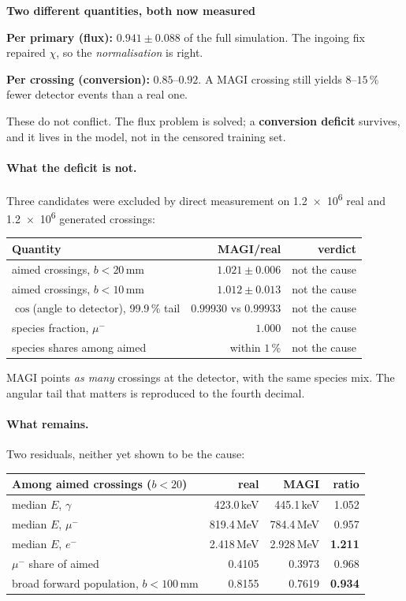 \documentclass[11pt,a4paper]{article}
\newenvironment{callout}[3]%
{\par\medskip\noindent
 \def\calloutframe{#1}\def\calloutback{#2}%
 \setlength{\fboxrule}{0.9pt}\setlength{\fboxsep}{8pt}%
 \begin{lrbox}{\calloutbox}%
 \begin{minipage}{\dimexpr\textwidth-2\fboxsep-2\fboxrule\relax}%
 \setlength{\parskip}{4pt}%
 \textcolor{#1}{\textbf{#3}}\par\nobreak\smallskip}
{\end{minipage}\end{lrbox}%
 \fcolorbox{\calloutframe}{\calloutback}{\usebox{\calloutbox}}%
 \par\medskip}
\begin{document}
\begin{callout}{warn}{red!4}{Two different quantities, both now measured}
\textbf{Per primary (flux):} $0.941 \pm 0.088$ of the full simulation. The
ingoing fix repaired $\chi$, so the \emph{normalisation} is right.

\textbf{Per crossing (conversion):} $0.85$--$0.92$. A MAGI crossing still yields
$8$--$15\,\%$ fewer detector events than a real one.

These do not conflict. The flux problem is solved; a \textbf{conversion deficit}
survives, and it lives in the model, not in the censored training set.
\end{callout}

\paragraph{What the deficit is not.} Three candidates were excluded by direct
measurement on \num{1.2e6} real and \num{1.2e6} generated crossings:

\begin{center}
\begin{tabular}{lrr}
\toprule
Quantity & MAGI/real & verdict \\
\midrule
aimed crossings, $b<20$\,mm     & $1.021 \pm 0.006$ & not the cause \\
aimed crossings, $b<10$\,mm     & $1.012 \pm 0.013$ & not the cause \\
$\cos$(angle to detector), 99.9\,\% tail & $0.99930$ vs $0.99933$ & not the cause \\
species fraction, $\mu^{-}$     & $1.000$ & not the cause \\
species shares among aimed      & within $1\,\%$ & not the cause \\
\bottomrule
\end{tabular}
\end{center}

MAGI points \emph{as many} crossings at the detector, with the same species mix.
The angular tail that matters is reproduced to the fourth decimal.

\paragraph{What remains.} Two residuals, neither yet shown to be the cause:

\begin{center}
\begin{tabular}{lrrr}
\toprule
Among aimed crossings ($b<20$) & real & MAGI & ratio \\
\midrule
median $E$, $\gamma$   & 423.0\,keV & 445.1\,keV & 1.052 \\
median $E$, $\mu^{-}$  & 819.4\,MeV & 784.4\,MeV & 0.957 \\
median $E$, $e^{-}$    & 2.418\,MeV & 2.928\,MeV & \textbf{1.211} \\
$\mu^{-}$ share of aimed & 0.4105 & 0.3973 & 0.968 \\
broad forward population, $b<100$\,mm & 0.8155 & 0.7619 & \textbf{0.934} \\
\bottomrule
\end{tabular}
\end{center}
\end{document}
